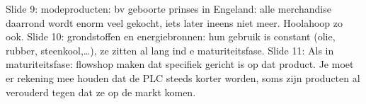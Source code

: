 \documentclass[10pt,a4paper]{report}
\begin{document}
Slide 9: modeproducten: bv geboorte prinses in Engeland: alle merchandise daarrond wordt enorm veel gekocht, iets later ineens niet meer. Hoolahoop zo ook.
Slide 10: grondstoffen en energiebronnen: hun gebruik is constant (olie, rubber, steenkool,…), ze zitten al lang ind e maturiteitsfase.
Slide 11: Als in maturiteitsfase: flowshop maken dat specifiek gericht is op dat product. 
Je moet er rekening mee houden dat de PLC steeds korter worden, soms zijn producten al verouderd tegen dat ze op de markt komen.
\end{document}
